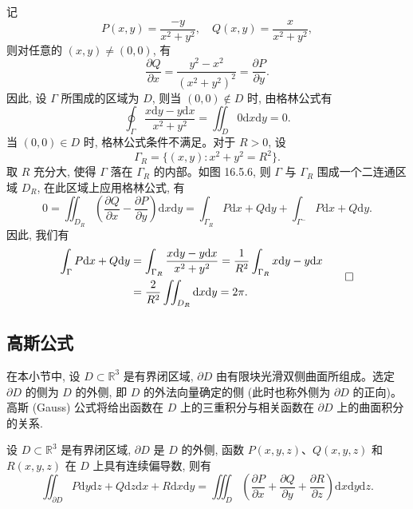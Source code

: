 \begin{solve}
记
\[
  P(x,y)=\frac{-y}{x^2+y^2},\quad Q(x,y)=\frac{x}{x^2+y^2},
\]
则对任意的 $(x,y)\ne(0,0)$, 有
\[
  \frac{\partial Q}{\partial x}=\frac{y^2-x^2}{(x^2+y^2)^2}=\frac{\partial P}{\partial y}.
\]
因此, 设 $\Gamma$ 所围成的区域为 $D$, 则当 $(0,0)\notin D$ 时, 由格林公式有
\[
  \oint_\Gamma\frac{x\mathrm dy-y\mathrm dx}{x^2+y^2}
  =\iint_D0\mathrm dx\mathrm dy=0.
\]
当 $(0,0)\in D$ 时, 格林公式条件不满足。对于 $R>0$, 设
\[
  \Gamma_R=\{(x,y):x^2+y^2=R^2\}.
\]
取 $R$ 充分大, 使得 $\Gamma$ 落在 $\Gamma_R$ 的内部。如图 16.5.6, 则 $\Gamma$ 与 $\Gamma_R$ 围成一个二连通区域 $D_R$, 在此区域上应用格林公式, 有
\[
  0=\iint_{D_R}\left(\frac{\partial Q}{\partial x}-\frac{\partial P}{\partial y}\right)\mathrm dx\mathrm dy
  =\int_{\Gamma_R}P\mathrm dx+Q\mathrm dy+\int_{\Gamma^-}P\mathrm dx+Q\mathrm dy.
\]
因此, 我们有
\[
\begin{aligned}
  \int_\Gamma P\mathrm dx+Q\mathrm dy
  &=\int_{\Gamma_R}\frac{x\mathrm dy-y\mathrm dx}{x^2+y^2}
    =\frac1{R^2}\int_{\Gamma_R}x\mathrm dy-y\mathrm dx\\
  &=\frac2{R^2}\iint_{D_R}\mathrm dx\mathrm dy=2\pi.
\end{aligned}
\qedhere
\]
\end{solve}


\subsection{高斯公式}
\label{subsec:ma-16-5-2}

在本小节中, 设 $D\subset\mathbb R^3$ 是有界闭区域, $\partial D$ 由有限块光滑双侧曲面所组成。选定 $\partial D$ 的侧为 $D$ 的外侧, 即 $D$ 的外法向量确定的侧 (此时也称外侧为 $\partial D$ 的正向)。高斯 (Gauss) 公式将给出函数在 $D$ 上的三重积分与相关函数在 $\partial D$ 上的曲面积分的关系.

\begin{theorem}[{高斯公式}]\label{theorem:ma-16-5-2}
设 $D\subset\mathbb R^3$ 是有界闭区域, $\partial D$ 是 $D$ 的外侧, 函数 $P(x,y,z)$、$Q(x,y,z)$ 和 $R(x,y,z)$ 在 $D$ 上具有连续偏导数, 则有
\[
  \iint_{\partial D}P\mathrm dy\mathrm dz+Q\mathrm dz\mathrm dx+R\mathrm dx\mathrm dy
  =\iiint_D\left(\frac{\partial P}{\partial x}+\frac{\partial Q}{\partial y}
  +\frac{\partial R}{\partial z}\right)\mathrm dx\mathrm dy\mathrm dz.
\]
\end{theorem}


